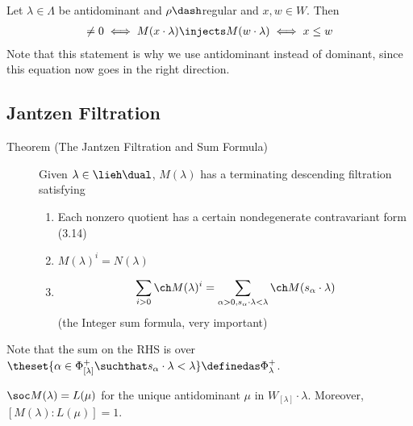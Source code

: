 \begin{description}
\tightlist
\item[Corollary]
Let \(\lambda \in \Lambda\) be antidominant and \(\rho\dash\)regular and
\(x, w\in W\). Then
\begin{align*}
[M(w\cdot \lambda) : L(x\cdot \lambda)] \neq 0 \iff M(x\cdot \lambda) \injects M(w\cdot \lambda) \iff x \leq w
\end{align*} Note that this statement is why we use antidominant instead
of dominant, since this equation now goes in the right direction.
\end{description}

\hypertarget{jantzen-filtration}{%
\subsection{Jantzen Filtration}\label{jantzen-filtration}}

\begin{description}
\item[Theorem (The Jantzen Filtration and Sum Formula)]
Given \(\lambda \in \lieh\dual\), \(M(\lambda)\) has a terminating
descending filtration satisfying

\begin{enumerate}
\def\labelenumi{\alph{enumi}.}
\item
  Each nonzero quotient has a certain nondegenerate contravariant form
  (3.14)
\item
  \(M(\lambda)^i = N(\lambda)\)
\item

  \begin{align*}\sum_{i > 0} \ch M(\lambda)^i = \sum_{\alpha > 0, s_\alpha \cdot \lambda < \lambda} \ch M(s_\alpha \cdot \lambda)\end{align*}
  (the Integer sum formula, very important)
\end{enumerate}
\end{description}

Note that the sum on the RHS is over
\(\theset{ \alpha\in\Phi^+_{[\lambda]} \suchthat s_\alpha \cdot \lambda < \lambda } \definedas \Phi^+_\lambda\).

\begin{description}
\tightlist
\item[Fact]
\(\soc M(\lambda) = L(\mu)\) for the unique antidominant \(\mu\) in
\(W_{[\lambda]}\cdot \lambda\). Moreover, \([M(\lambda) : L(\mu)] = 1\).
\end{description}

